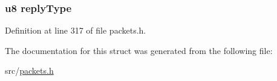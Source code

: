 \hypertarget{struct_v_m___r_e_p_l_y_a22d54946f3de285a0602996eeab97bb2}{}
\subsubsection[{reply\+Type}]{ {\bf u8} reply\+Type}\label{struct_v_m___r_e_p_l_y_a22d54946f3de285a0602996eeab97bb2}


Definition at line 317 of file packets.\+h.



The documentation for this struct was generated from the following file\+:\begin{DoxyCompactItemize}
\item 
src/\hyperlink{packets_8h}{packets.\+h}\end{DoxyCompactItemize}

